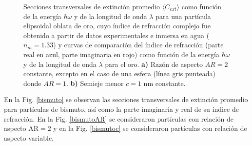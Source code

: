 \begin{figure}[H]
	\quad%
	\caption{Secciones transversales de extinción promedio $\langle C_{ext}\rangle$ como función de la energía $\hbar\omega$ y de la longitud de onda $\lambda$ para una partícula elipsoidal oblata de oro, cuyo índice de refracción complejo fue obtenido a partir de datos experimentales  e inmersa en agua ($n_m=1.33$) y curvas de comparación del índice de refracción (parte real en azul, parte imaginaria en rojo) como función de la energía $\hbar\omega$ y de la longitud de onda $\lambda$ para el oro. \textbf{a)} Razón de aspecto $AR=2$ constante, excepto en el caso de una esfera (línea gris punteada) donde $AR=1$. \textbf{b)} Semieje menor $c=1$ nm constante.}\label{oro}
\end{figure}


En la Fig. \ref{bismuto} se observan las secciones transversales de extinción promedio para partículas de bismuto, así como la parte imaginaria y real de su índice de refracción. En la Fig. \ref{bismutoAR} se consideraron partículas con relación de aspecto AR$=2$  y en la Fig. \ref{bismutoc} se consideraron partículas con relación de aspecto variable.

